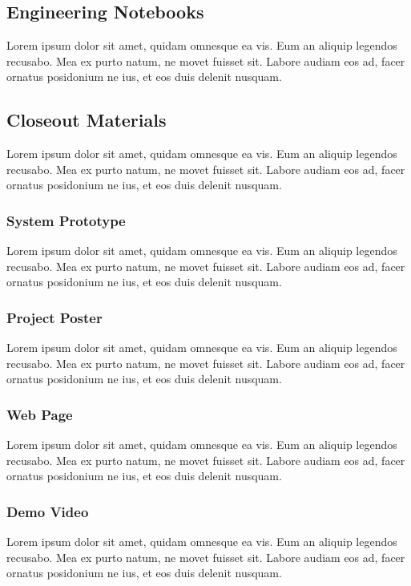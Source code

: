 \subsection{Engineering Notebooks}
Lorem ipsum dolor sit amet, quidam omnesque ea vis. Eum an aliquip legendos recusabo. Mea ex purto natum, ne movet fuisset sit. Labore audiam eos ad, facer ornatus posidonium ne ius, et eos duis delenit nusquam.

\subsection{Closeout Materials}
Lorem ipsum dolor sit amet, quidam omnesque ea vis. Eum an aliquip legendos recusabo. Mea ex purto natum, ne movet fuisset sit. Labore audiam eos ad, facer ornatus posidonium ne ius, et eos duis delenit nusquam.

\subsubsection{System Prototype}
Lorem ipsum dolor sit amet, quidam omnesque ea vis. Eum an aliquip legendos recusabo. Mea ex purto natum, ne movet fuisset sit. Labore audiam eos ad, facer ornatus posidonium ne ius, et eos duis delenit nusquam.

\subsubsection{Project Poster}
Lorem ipsum dolor sit amet, quidam omnesque ea vis. Eum an aliquip legendos recusabo. Mea ex purto natum, ne movet fuisset sit. Labore audiam eos ad, facer ornatus posidonium ne ius, et eos duis delenit nusquam.

\subsubsection{Web Page}
Lorem ipsum dolor sit amet, quidam omnesque ea vis. Eum an aliquip legendos recusabo. Mea ex purto natum, ne movet fuisset sit. Labore audiam eos ad, facer ornatus posidonium ne ius, et eos duis delenit nusquam.

\subsubsection{Demo Video}
Lorem ipsum dolor sit amet, quidam omnesque ea vis. Eum an aliquip legendos recusabo. Mea ex purto natum, ne movet fuisset sit. Labore audiam eos ad, facer ornatus posidonium ne ius, et eos duis delenit nusquam.

